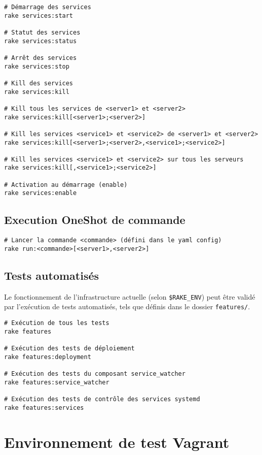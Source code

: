 \documentclass[a4paper,oneside,12pt]{article}
\begin{document}
\begin{verbatim}
# Démarrage des services
rake services:start

# Statut des services
rake services:status

# Arrêt des services
rake services:stop

# Kill des services
rake services:kill

# Kill tous les services de <server1> et <server2>
rake services:kill[<server1>;<server2>]

# Kill les services <service1> et <service2> de <server1> et <server2>
rake services:kill[<server1>;<server2>,<service1>;<service2>]

# Kill les services <service1> et <service2> sur tous les serveurs
rake services:kill[,<service1>;<service2>]

# Activation au démarrage (enable)
rake services:enable
\end{verbatim}

\subsection{Execution OneShot de commande}

\begin{verbatim}
# Lancer la commande <commande> (défini dans le yaml config)
rake run:<commande>[<server1>,<server2>]
\end{verbatim}


\subsection{Tests automatisés}

Le fonctionnement de l'infrastructure actuelle (selon \verb!$RAKE_ENV!) peut être
validé par l'exécution de tests automatisés, tels que définis dans le dossier
\verb!features/!.

\begin{verbatim}
# Exécution de tous les tests
rake features

# Exécution des tests de déploiement
rake features:deployment

# Exécution des tests du composant service_watcher
rake features:service_watcher

# Exécution des tests de contrôle des services systemd
rake features:services
\end{verbatim}

\pagebreak
\section{Environnement de test Vagrant}
\end{document}
